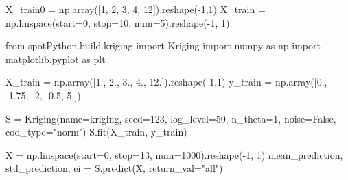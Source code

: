 \documentclass[
  letterpaper,
  DIV=11,
  numbers=noendperiod]{scrreprt}
\newenvironment{Shaded}{\begin{snugshade}}{\end{snugshade}}
\newcommand{\DecValTok}[1]{\textcolor[rgb]{0.68,0.00,0.00}{#1}}
\newcommand{\FloatTok}[1]{\textcolor[rgb]{0.68,0.00,0.00}{#1}}
\newcommand{\ImportTok}[1]{\textcolor[rgb]{0.00,0.46,0.62}{#1}}
\newcommand{\NormalTok}[1]{\textcolor[rgb]{0.00,0.23,0.31}{#1}}
\newcommand{\OperatorTok}[1]{\textcolor[rgb]{0.37,0.37,0.37}{#1}}
\newcommand{\StringTok}[1]{\textcolor[rgb]{0.13,0.47,0.30}{#1}}
\newcommand{\VariableTok}[1]{\textcolor[rgb]{0.07,0.07,0.07}{#1}}
\begin{document}
\begin{Shaded}
\begin{Highlighting}[]
\NormalTok{X\_train0 }\OperatorTok{=}\NormalTok{ np.array([}\DecValTok{1}\NormalTok{, }\DecValTok{2}\NormalTok{, }\DecValTok{3}\NormalTok{, }\DecValTok{4}\NormalTok{, }\DecValTok{12}\NormalTok{]).reshape(}\OperatorTok{{-}}\DecValTok{1}\NormalTok{,}\DecValTok{1}\NormalTok{)}
\NormalTok{X\_train }\OperatorTok{=}\NormalTok{ np.linspace(start}\OperatorTok{=}\DecValTok{0}\NormalTok{, stop}\OperatorTok{=}\DecValTok{10}\NormalTok{, num}\OperatorTok{=}\DecValTok{5}\NormalTok{).reshape(}\OperatorTok{{-}}\DecValTok{1}\NormalTok{, }\DecValTok{1}\NormalTok{)}
\end{Highlighting}
\end{Shaded}

\begin{Shaded}
\begin{Highlighting}[]
\ImportTok{from}\NormalTok{ spotPython.build.kriging }\ImportTok{import}\NormalTok{ Kriging}
\ImportTok{import}\NormalTok{ numpy }\ImportTok{as}\NormalTok{ np}
\ImportTok{import}\NormalTok{ matplotlib.pyplot }\ImportTok{as}\NormalTok{ plt}

\NormalTok{X\_train }\OperatorTok{=}\NormalTok{ np.array([}\FloatTok{1.}\NormalTok{, }\FloatTok{2.}\NormalTok{, }\FloatTok{3.}\NormalTok{, }\FloatTok{4.}\NormalTok{, }\FloatTok{12.}\NormalTok{]).reshape(}\OperatorTok{{-}}\DecValTok{1}\NormalTok{,}\DecValTok{1}\NormalTok{)}
\NormalTok{y\_train }\OperatorTok{=}\NormalTok{ np.array([}\FloatTok{0.}\NormalTok{, }\OperatorTok{{-}}\FloatTok{1.75}\NormalTok{, }\OperatorTok{{-}}\DecValTok{2}\NormalTok{, }\OperatorTok{{-}}\FloatTok{0.5}\NormalTok{, }\FloatTok{5.}\NormalTok{])}

\NormalTok{S }\OperatorTok{=}\NormalTok{ Kriging(name}\OperatorTok{=}\StringTok{\textquotesingle{}kriging\textquotesingle{}}\NormalTok{,  seed}\OperatorTok{=}\DecValTok{123}\NormalTok{, log\_level}\OperatorTok{=}\DecValTok{50}\NormalTok{, n\_theta}\OperatorTok{=}\DecValTok{1}\NormalTok{, noise}\OperatorTok{=}\VariableTok{False}\NormalTok{, cod\_type}\OperatorTok{=}\StringTok{"norm"}\NormalTok{)}
\NormalTok{S.fit(X\_train, y\_train)}

\NormalTok{X }\OperatorTok{=}\NormalTok{ np.linspace(start}\OperatorTok{=}\DecValTok{0}\NormalTok{, stop}\OperatorTok{=}\DecValTok{13}\NormalTok{, num}\OperatorTok{=}\DecValTok{1000}\NormalTok{).reshape(}\OperatorTok{{-}}\DecValTok{1}\NormalTok{, }\DecValTok{1}\NormalTok{)}
\NormalTok{mean\_prediction, std\_prediction, ei }\OperatorTok{=}\NormalTok{ S.predict(X, return\_val}\OperatorTok{=}\StringTok{"all"}\NormalTok{)}


\end{Highlighting}
\end{Shaded}
\end{document}
